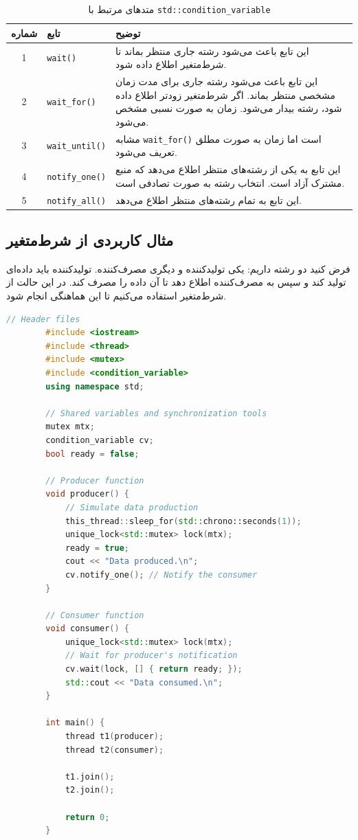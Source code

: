 \documentclass[12pt, a4paper]{report}
\begin{document}
\begin{table}[h!]
	\centering
	\begin{tabular}{|c|l|p{8cm}|}
		\hline
		\textbf{شماره} & \textbf{تابع} & \textbf{توضیح} \\
		\hline
		1 & \texttt{wait()} & این تابع باعث می‌شود رشته جاری منتظر بماند تا شرط‌متغیر اطلاع داده شود. \\
		\hline
		2 & \texttt{wait\_for()} & این تابع باعث می‌شود رشته جاری برای مدت زمان مشخصی منتظر بماند. اگر شرط‌متغیر زودتر اطلاع داده شود، رشته بیدار می‌شود. زمان به صورت نسبی مشخص می‌شود. \\
		\hline
		3 & \texttt{wait\_until()} & مشابه \texttt{wait\_for()} است اما زمان به صورت مطلق تعریف می‌شود. \\
		\hline
		4 & \texttt{notify\_one()} & این تابع به یکی از رشته‌های منتظر اطلاع می‌دهد که منبع مشترک آزاد است. انتخاب رشته به صورت تصادفی است. \\
		\hline
		5 & \texttt{notify\_all()} & این تابع به تمام رشته‌های منتظر اطلاع می‌دهد. \\
		\hline
	\end{tabular}
	\caption{متدهای مرتبط با \texttt{std::condition\_variable}}
\end{table}


\subsection{مثال کاربردی از شرط‌متغیر}

فرض کنید دو رشته داریم: یکی تولیدکننده و دیگری مصرف‌کننده. تولیدکننده باید داده‌ای تولید کند و سپس به مصرف‌کننده اطلاع دهد تا آن داده را مصرف کند. در این حالت از شرط‌متغیر استفاده می‌کنیم تا این هماهنگی انجام شود.

\begin{LTR}
	\begin{lstlisting}[language=C++, breaklines=true]
		// Header files
		#include <iostream>
		#include <thread>
		#include <mutex>
		#include <condition_variable>
		using namespace std;
		
		// Shared variables and synchronization tools
		mutex mtx;
		condition_variable cv;
		bool ready = false;
		
		// Producer function
		void producer() {
			// Simulate data production
			this_thread::sleep_for(std::chrono::seconds(1));
			unique_lock<std::mutex> lock(mtx);
			ready = true;
			cout << "Data produced.\n";
			cv.notify_one(); // Notify the consumer
		}
		
		// Consumer function
		void consumer() {
			unique_lock<std::mutex> lock(mtx);
			// Wait for producer's notification
			cv.wait(lock, [] { return ready; });
			std::cout << "Data consumed.\n";
		}
		
		int main() {
			thread t1(producer);
			thread t2(consumer);
			
			t1.join();
			t2.join();
			
			return 0;
		}
	\end{lstlisting}
\end{LTR}
\end{document}

